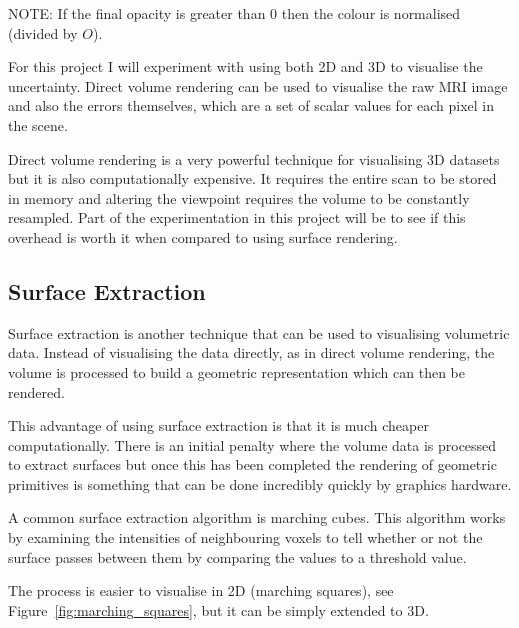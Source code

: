 \documentclass[
  oneside,
  11pt, a4paper,
  footinclude=true,
  headinclude=true,
  cleardoublepage=empty
]{scrbook}
\begin{document}
NOTE: If the final opacity is greater than 0 then the colour is normalised (divided by $O$).

For this project I will experiment with using both 2D and 3D to visualise the uncertainty. Direct volume rendering can be used to visualise the raw MRI image and also the errors themselves, which are a set of scalar values for each pixel in the scene.

Direct volume rendering is a very powerful technique for visualising 3D datasets but it is also computationally expensive. It requires the entire scan to be stored in memory and altering the viewpoint requires the volume to be constantly resampled. Part of the experimentation in this project will be to see if this overhead is worth it when compared to using surface rendering.

\newpage
\subsection{Surface Extraction}
Surface extraction is another technique that can be used to visualising volumetric data. Instead of visualising the data directly, as in direct volume rendering, the volume is processed to build a geometric representation which can then be rendered.

This advantage of using surface extraction is that it is much cheaper computationally\cite{surfacevsvolumerendering}. There is an initial penalty where the volume data is processed to extract surfaces but once this has been completed the rendering of geometric primitives is something that can be done incredibly quickly by graphics hardware.

A common surface extraction algorithm is marching cubes. This algorithm works by examining the intensities of neighbouring voxels to tell whether or not the surface passes between them by comparing the values to a threshold value. 

The process is easier to visualise in 2D (marching squares), see Figure~\ref{fig:marching_squares}, but it can be simply extended to 3D.
\end{document}
